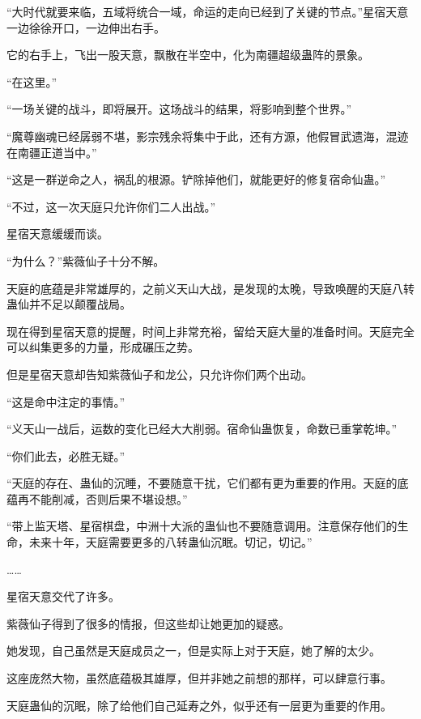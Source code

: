 \begin{this_body}
“大时代就要来临，五域将统合一域，命运的走向已经到了关键的节点。”星宿天意一边徐徐开口，一边伸出右手。

它的右手上，飞出一股天意，飘散在半空中，化为南疆超级蛊阵的景象。

“在这里。”

“一场关键的战斗，即将展开。这场战斗的结果，将影响到整个世界。”

“魔尊幽魂已经孱弱不堪，影宗残余将集中于此，还有方源，他假冒武遗海，混迹在南疆正道当中。”

“这是一群逆命之人，祸乱的根源。铲除掉他们，就能更好的修复宿命仙蛊。”

“不过，这一次天庭只允许你们二人出战。”

星宿天意缓缓而谈。

“为什么？”紫薇仙子十分不解。

天庭的底蕴是非常雄厚的，之前义天山大战，是发现的太晚，导致唤醒的天庭八转蛊仙并不足以颠覆战局。

现在得到星宿天意的提醒，时间上非常充裕，留给天庭大量的准备时间。天庭完全可以纠集更多的力量，形成碾压之势。

但是星宿天意却告知紫薇仙子和龙公，只允许你们两个出动。

“这是命中注定的事情。”

“义天山一战后，运数的变化已经大大削弱。宿命仙蛊恢复，命数已重掌乾坤。”

“你们此去，必胜无疑。”

“天庭的存在、蛊仙的沉睡，不要随意干扰，它们都有更为重要的作用。天庭的底蕴再不能削减，否则后果不堪设想。”

“带上监天塔、星宿棋盘，中洲十大派的蛊仙也不要随意调用。注意保存他们的生命，未来十年，天庭需要更多的八转蛊仙沉眠。切记，切记。”

……

星宿天意交代了许多。

紫薇仙子得到了很多的情报，但这些却让她更加的疑惑。

她发现，自己虽然是天庭成员之一，但是实际上对于天庭，她了解的太少。

这座庞然大物，虽然底蕴极其雄厚，但并非她之前想的那样，可以肆意行事。

天庭蛊仙的沉眠，除了给他们自己延寿之外，似乎还有一层更为重要的作用。

\end{this_body}

